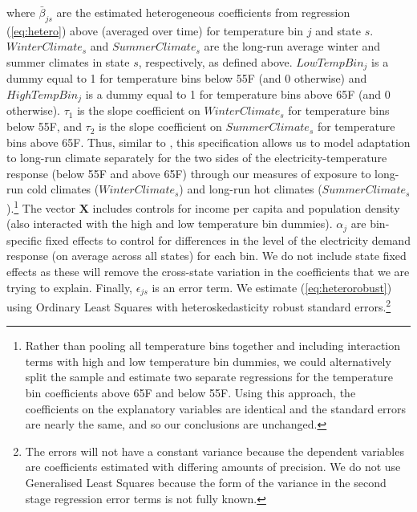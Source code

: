 \documentclass[11pt]{article}
\begin{document}
where $\bar{\beta}_{js}$ are the estimated heterogeneous coefficients from regression (\ref{eq:hetero}) above (averaged over time) for temperature bin $j$ and state $s$. $WinterClimate_{s}$ and $SummerClimate_{s}$ are the long-run average winter and summer climates in state $s$, respectively, as defined above. $LowTempBin_{j}$ is a dummy equal to 1 for temperature bins below 55\degree F (and 0 otherwise) and $HighTempBin_{j}$ is a dummy equal to 1 for temperature bins above 65\degree F (and 0 otherwise). $\tau_{1}$ is the slope coefficient on $WinterClimate_{s}$ for temperature bins below 55\degree F, and $\tau_{2}$ is the slope coefficient on $SummerClimate_{s}$ for temperature bins above 65\degree F. Thus, similar to \cite{Rode2021}, this specification allows us to model adaptation to long-run climate separately for the two sides of the electricity-temperature response (below 55\degree F and above 65\degree F) through our measures of exposure to long-run cold climates ($WinterClimate_{s}$) and long-run hot climates ($SummerClimate_{s}$).\footnote{Rather than pooling all temperature bins together and including interaction terms with high and low temperature bin dummies, we could alternatively split the sample and estimate two separate regressions for the temperature bin coefficients above 65\degree F and below 55\degree F. Using this approach, the coefficients on the explanatory variables are identical and the standard errors are nearly the same, and so our conclusions are unchanged.} The vector $\textbf{X}$ includes controls for income per capita and population density (also interacted with the high and low temperature bin dummies). $\alpha_{j}$ are bin-specific fixed effects to control for differences in the level of the electricity demand response (on average across all states) for each bin. We do not include state fixed effects as these will remove the cross-state variation in the coefficients that we are trying to explain. Finally, $\epsilon_{js}$ is an error term. We estimate (\ref{eq:heterorobust}) using Ordinary Least Squares with heteroskedasticity robust standard errors.\footnote{ The errors will not have a constant variance because the dependent variables are coefficients estimated with differing amounts of precision. We do not use Generalised Least Squares because the form of the variance in the second stage regression error terms is not fully known.} 
\end{document}
